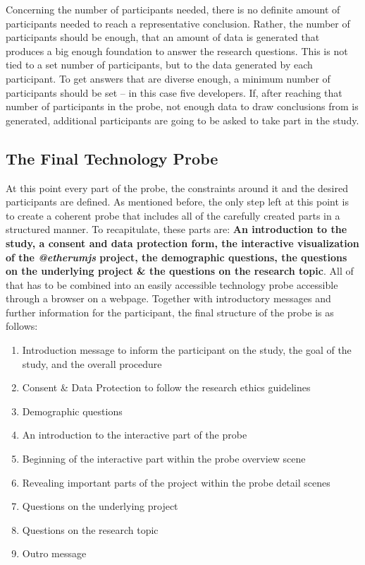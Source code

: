 Concerning the number of participants needed, there is no definite amount of participants needed to reach a representative conclusion. Rather, the number of participants should be enough, that an amount of data is generated that produces a big enough foundation to answer the research questions. This is not tied to a set number of participants, but to the data generated by each participant. To get answers that are diverse enough, a minimum number of participants should be set -- in this case five developers. If, after reaching that number of participants in the probe, not enough data to draw conclusions from is generated, additional participants are going to be asked to take part in the study.

\subsection{The Final Technology Probe}

At this point every part of the probe, the constraints around it and the desired participants are defined. As mentioned before, the only step left at this point is to create a coherent probe that includes all of the carefully created parts in a structured manner. To recapitulate, these parts are: \textbf{An introduction to the study, a consent and data protection form, the interactive visualization of the \textit{@etherumjs} project, the demographic questions, the questions on the underlying project \& the questions on the research topic}. All of that has to be combined into an easily accessible technology probe accessible through a browser on a webpage. Together with introductory messages and further information for the participant, the final structure of the probe is as follows:

\begin{enumerate}
  \item{Introduction message to inform the participant on the study, the goal of the study, and the overall procedure}
  \item{Consent \& Data Protection to follow the research ethics guidelines}
  \item{Demographic questions}
  \item{An introduction to the interactive part of the probe}
  \item{Beginning of the interactive part within the probe overview scene}
  \item{Revealing important parts of the project within the probe detail scenes}
  \item{Questions on the underlying project}
  \item{Questions on the research topic}
  \item{Outro message}
\end{enumerate}

